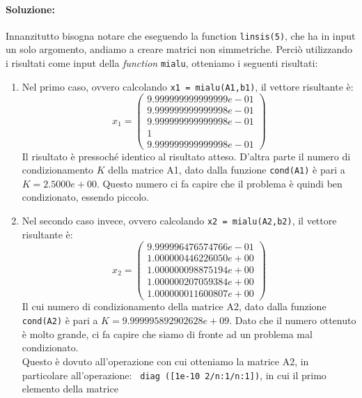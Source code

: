 \documentclass[12pt]{article}
\begin{document}
\paragraph{Soluzione:}
Innanzitutto bisogna notare che eseguendo la function \texttt{linsis(5)}, che ha in input un solo argomento, andiamo a creare matrici non simmetriche. 
Perciò utilizzando i risultati come input della \textit{function} \texttt{mialu}, otteniamo i seguenti risultati:
\begin{enumerate}
    \item Nel primo caso, ovvero calcolando \texttt{x1 = mialu(A1,b1)}, il vettore risultante è: 
    \begin{equation*} x_1=
        \begin{pmatrix}
            9.999999999999999e-01\\
            9.999999999999998e-01\\
            9.999999999999998e-01\\
            1\\
            9.999999999999998e-01
        \end{pmatrix}
    \end{equation*}
    Il risultato è pressoché identico al risultato atteso. D'altra parte il numero di condizionamento \(K\) della matrice A1, dato dalla funzione \texttt{cond(A1)}
    è pari a \(K = 2.5000e+00\). Questo numero ci fa capire che il problema è quindi ben condizionato, essendo piccolo.
    \item Nel secondo caso invece, ovvero calcolando \texttt{x2 = mialu(A2,b2)}, il vettore risultante è:
    \begin{equation*} x_2=
        \begin{pmatrix}
            9.999996476574766e-01\\
            1.000000446226050e+00\\
            1.000000098875194e+00\\
            1.000000207059384e+00\\
            1.000000011600807e+00
        \end{pmatrix}
    \end{equation*}
    Il cui numero di condizionamento della matrice A2, dato dalla funzione \texttt{cond(A2)} è pari a \(K = 9.999995892902628e+09\). Dato che il numero ottenuto è molto 
    grande, ci fa capire che siamo di fronte ad un problema mal condizionato. \\
    Questo è dovuto all'operazione con cui otteniamo la matrice A2, in particolare all'operazione: \texttt{ diag ([1e-10 2/n:1/n:1])}, in cui il primo elemento della matrice 

\end{enumerate}
\end{document}
